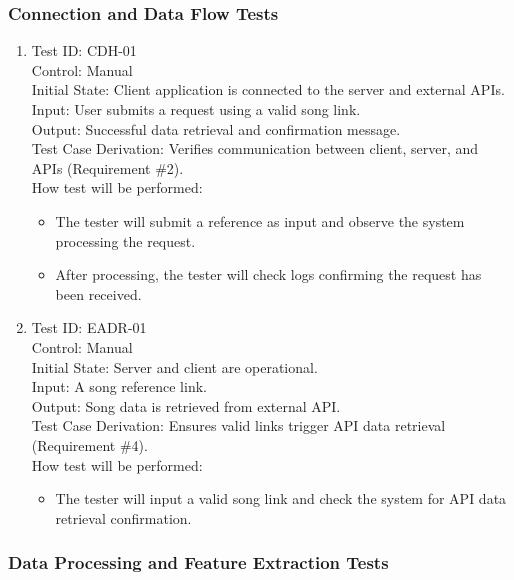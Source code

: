 \documentclass[12pt, titlepage]{article}
\begin{document}
\subsubsection{Connection and Data Flow Tests}

\begin{enumerate}

\item Test ID: CDH-01\\
Control: Manual\\
Initial State: Client application is connected to the server and external APIs.\\
Input: User submits a request using a valid song link.\\
Output: Successful data retrieval and confirmation message.\\
Test Case Derivation: Verifies communication between client, server, and APIs (Requirement \#2).\\
How test will be performed:
\begin{itemize}
    \item The tester will submit a reference as input and observe the system processing the request.
    \item After processing, the tester will check logs confirming the request has been received.
\end{itemize}

\item Test ID: EADR-01\\
Control: Manual\\
Initial State: Server and client are operational.\\
Input: A song reference link.\\
Output: Song data is retrieved from external API.\\
Test Case Derivation: Ensures valid links trigger API data retrieval (Requirement \#4).\\
How test will be performed:
\begin{itemize}
    \item The tester will input a valid song link and check the system for API data retrieval confirmation.
\end{itemize}

\end{enumerate}

\subsubsection{Data Processing and Feature Extraction Tests}
\end{document}
